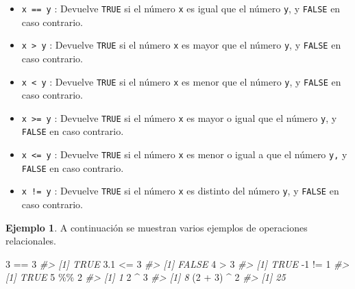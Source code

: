 \documentclass[
]{book}
\newenvironment{Shaded}{\begin{snugshade}}{\end{snugshade}}
\newcommand{\CommentTok}[1]{\textcolor[rgb]{0.56,0.35,0.01}{\textit{#1}}}
\newcommand{\DecValTok}[1]{\textcolor[rgb]{0.00,0.00,0.81}{#1}}
\newcommand{\FloatTok}[1]{\textcolor[rgb]{0.00,0.00,0.81}{#1}}
\newcommand{\NormalTok}[1]{#1}
\newcommand{\SpecialCharTok}[1]{\textcolor[rgb]{0.00,0.00,0.00}{#1}}
\providecommand{\tightlist}{%
  \setlength{\itemsep}{0pt}\setlength{\parskip}{0pt}}
\theoremstyle{definition}
\theoremstyle{definition}
\newtheorem{example}{Ejemplo}[chapter]
\theoremstyle{definition}
\theoremstyle{definition}
\theoremstyle{remark}
\begin{document}
\begin{itemize}
\tightlist
\item
  \texttt{x\ ==\ y} : Devuelve \texttt{TRUE} si el número \texttt{x} es igual que el número \texttt{y}, y \texttt{FALSE} en caso contrario.
\item
  \texttt{x\ \textgreater{}\ y} : Devuelve \texttt{TRUE} si el número \texttt{x} es mayor que el número \texttt{y}, y \texttt{FALSE} en caso contrario.
\item
  \texttt{x\ \textless{}\ y} : Devuelve \texttt{TRUE} si el número \texttt{x} es menor que el número \texttt{y}, y \texttt{FALSE} en caso contrario.
\item
  \texttt{x\ \textgreater{}=\ y} : Devuelve \texttt{TRUE} si el número \texttt{x} es mayor o igual que el número \texttt{y}, y \texttt{FALSE} en caso contrario.
\item
  \texttt{x\ \textless{}=\ y} : Devuelve \texttt{TRUE} si el número \texttt{x} es menor o igual a que el número \texttt{y,} y \texttt{FALSE} en caso contrario.
\item
  \texttt{x\ !=\ y} : Devuelve \texttt{TRUE} si el número \texttt{x} es distinto del número \texttt{y}, y \texttt{FALSE} en caso contrario.
\end{itemize}

\begin{example}

A continuación se muestran varios ejemplos de operaciones relacionales.

\begin{Shaded}
\begin{Highlighting}[]
\DecValTok{3} \SpecialCharTok{==} \DecValTok{3}
\CommentTok{\#\textgreater{} [1] TRUE}
\FloatTok{3.1} \SpecialCharTok{\textless{}=} \DecValTok{3}
\CommentTok{\#\textgreater{} [1] FALSE}
\DecValTok{4} \SpecialCharTok{\textgreater{}} \DecValTok{3}
\CommentTok{\#\textgreater{} [1] TRUE}
\SpecialCharTok{{-}}\DecValTok{1} \SpecialCharTok{!=} \DecValTok{1}
\CommentTok{\#\textgreater{} [1] TRUE}
\DecValTok{5} \SpecialCharTok{\%\%} \DecValTok{2}
\CommentTok{\#\textgreater{} [1] 1}
\DecValTok{2} \SpecialCharTok{\^{}} \DecValTok{3}
\CommentTok{\#\textgreater{} [1] 8}
\NormalTok{(}\DecValTok{2} \SpecialCharTok{+} \DecValTok{3}\NormalTok{) }\SpecialCharTok{\^{}} \DecValTok{2}
\CommentTok{\#\textgreater{} [1] 25}
\end{Highlighting}
\end{Shaded}

\end{example}
\end{document}
